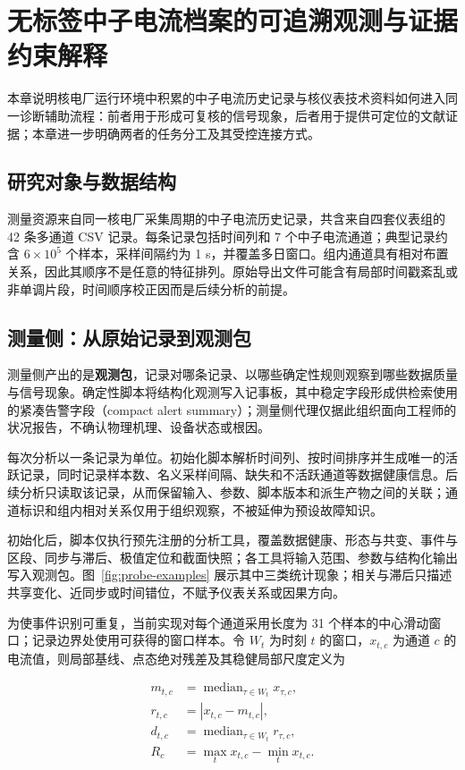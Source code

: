 \newpage
\section{无标签中子电流档案的可追溯观测与证据约束解释}

本章说明核电厂运行环境中积累的中子电流历史记录与核仪表技术资料如何进入同一诊断辅助流程：前者用于形成可复核的信号现象，后者用于提供可定位的文献证据；本章进一步明确两者的任务分工及其受控连接方式。

\subsection{研究对象与数据结构}

测量资源来自同一核电厂采集周期的中子电流历史记录，共含来自四套仪表组的 42 条多通道 CSV 记录。每条记录包括时间列和 7 个中子电流通道；典型记录约含 $6\times10^{5}$ 个样本，采样间隔约为 1 s，并覆盖多日窗口。组内通道具有相对布置关系，因此其顺序不是任意的特征排列。原始导出文件可能含有局部时间戳紊乱或非单调片段，时间顺序校正因而是后续分析的前提。

\subsection{测量侧：从原始记录到观测包}

测量侧产出的是\textbf{观测包}，记录对哪条记录、以哪些确定性规则观察到哪些数据质量与信号现象。确定性脚本将结构化观测写入记事板，其中稳定字段形成供检索使用的紧凑告警字段（compact alert summary）；测量侧代理仅据此组织面向工程师的状况报告，不确认物理机理、设备状态或根因。

每次分析以一条记录为单位。初始化脚本解析时间列、按时间排序并生成唯一的活跃记录，同时记录样本数、名义采样间隔、缺失和不活跃通道等数据健康信息。后续分析只读取该记录，从而保留输入、参数、脚本版本和派生产物之间的关联；通道标识和组内相对关系仅用于组织观察，不被延伸为预设故障知识。

初始化后，脚本仅执行预先注册的分析工具，覆盖数据健康、形态与共变、事件与区段、同步与滞后、极值定位和截面快照；各工具将输入范围、参数与结构化输出写入观测包。图~\ref{fig:probe-examples} 展示其中三类统计现象；相关与滞后只描述共享变化、近同步或时间错位，不赋予仪表关系或因果方向。

为使事件识别可重复，当前实现对每个通道采用长度为 31 个样本的中心滑动窗口；记录边界处使用可获得的窗口样本。令 $W_t$ 为时刻 $t$ 的窗口，$x_{t,c}$ 为通道 $c$ 的电流值，则局部基线、点态绝对残差及其稳健局部尺度定义为

\[
\begin{aligned}
m_{t,c} &= \operatorname{median}_{\tau\in W_t}x_{\tau,c},\\
r_{t,c} &= \left|x_{t,c}-m_{t,c}\right|,\\
d_{t,c} &= \operatorname{median}_{\tau\in W_t}r_{\tau,c},\\
R_c &= \max_t x_{t,c}-\min_t x_{t,c}.
\end{aligned}
\]

